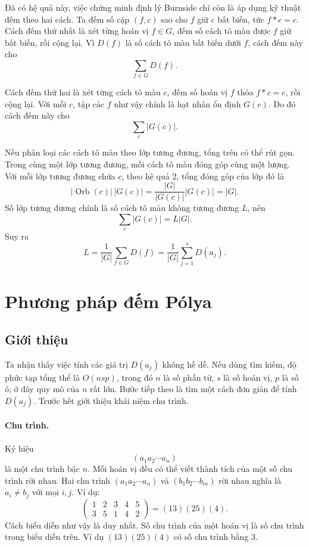 \documentclass[11pt]{article}
\begin{document}
Đã có hệ quả này, việc chứng minh định lý Burnside chỉ còn là áp dụng kỹ
thuật đếm theo hai cách. Ta đếm số cặp \((f,c)\) sao cho \(f\) giữ \(c\) bất
biến, tức \(f*c=c\). Cách đếm thứ nhất là xét từng hoán vị \(f\in G\), đếm số
cách tô màu được \(f\) giữ bất biến, rồi cộng lại. Vì \(D(f)\) là số cách tô
màu bất biến dưới \(f\), cách đếm này cho
\[
  \sum_{f\in G}D(f).
\]

Cách đếm thứ hai là xét từng cách tô màu \(c\), đếm số hoán vị \(f\) thỏa
\(f*c=c\), rồi cộng lại. Với mỗi \(c\), tập các \(f\) như vậy chính là hạt
nhân ổn định \(G(c)\). Do đó cách đếm này cho
\[
  \sum_c |G(c)|.
\]

Nếu phân loại các cách tô màu theo lớp tương đương, tổng trên có thể rút gọn.
Trong cùng một lớp tương đương, mỗi cách tô màu đóng góp cùng một lượng. Với
mỗi lớp tương đương chứa \(c\), theo hệ quả 2, tổng đóng góp của lớp đó là
\[
  |\operatorname{Orb}(c)|\,|G(c)|
  =\frac{|G|}{|G(c)|}|G(c)|
  =|G|.
\]
Số lớp tương đương chính là số cách tô màu không tương đương \(L\), nên
\[
  \sum_c |G(c)|=L|G|.
\]
Suy ra
\[
  L=\frac{1}{|G|}\sum_{f\in G}D(f)
   =\frac{1}{|G|}\sum_{j=1}^{s}D(a_j).
\]

\section{Phương pháp đếm Pólya}

\subsection{Giới thiệu}

Ta nhận thấy việc tính các giá trị \(D(a_j)\) không hề dễ. Nếu dùng tìm kiếm,
độ phức tạp tổng thể là \(O(nsp)\), trong đó \(n\) là số phần tử, \(s\) là số
hoán vị, \(p\) là số ô; ở đây quy mô của \(n\) rất lớn. Bước tiếp theo là tìm
một cách đơn giản để tính \(D(a_j)\). Trước hết giới thiệu khái niệm chu trình.

\paragraph{Chu trình.}
Ký hiệu
\[
  (a_1a_2\cdots a_n)
\]
là một chu trình bậc \(n\). Mỗi hoán vị đều có thể viết thành tích của một số
chu trình rời nhau. Hai chu trình \((a_1a_2\cdots a_n)\) và
\((b_1b_2\cdots b_m)\) rời nhau nghĩa là \(a_i\ne b_j\) với mọi \(i,j\). Ví
dụ:
\[
  \begin{pmatrix}
    1&2&3&4&5\\
    3&5&1&4&2
  \end{pmatrix}
  =(13)(25)(4).
\]
Cách biểu diễn như vậy là duy nhất. Số chu trình của một hoán vị là số chu
trình trong biểu diễn trên. Ví dụ \((13)(25)(4)\) có số chu trình bằng \(3\).
\end{document}
